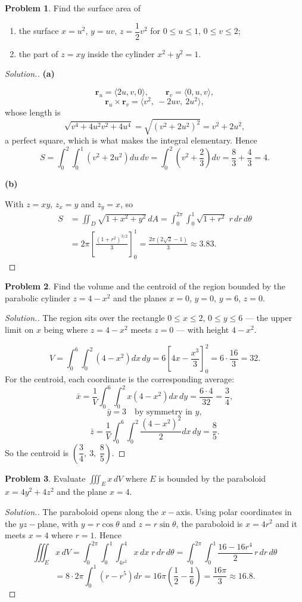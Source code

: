 \documentclass[11pt,a4paper]{article}
\theoremstyle{definition}
\newtheorem{problemx}{Problem}[subsection]
\newenvironment{problem}{\begin{problemx}}{\end{problemx}}
\newenvironment{solution}
  {\renewcommand{\qedsymbol}{}\begin{proof}[\textit{Solution}.]}
  {\end{proof}}
\newcommand{\subhead}[1]{%
  \par\medskip\noindent\textbf{#1}\par\nobreak\smallskip}
\begin{document}
\begin{problem}
Find the surface area of
\begin{enumerate}
\item[(a)] the surface $x = u^2$, $y = uv$, $z = \dfrac12v^2$ for
$0\leq u\leq 1$, $0\leq v\leq 2$;
\item[(b)] the part of $z = xy$ inside the cylinder $x^2+y^2 = 1$.
\end{enumerate}
\end{problem}
\begin{solution}
\subhead{(a)}
\[\mathbf r_u = \langle 2u, v, 0\rangle,\qquad
\mathbf r_v = \langle 0, u, v\rangle ,\]
\[\mathbf r_u\times\mathbf r_v = \langle v^2,\ -2uv,\ 2u^2\rangle ,\]
whose length is
\[\sqrt{v^4+4u^2v^2+4u^4} = \sqrt{(v^2+2u^2)^2} = v^2+2u^2 ,\]
a perfect square, which is what makes the integral elementary. Hence
\[S = \int_0^2\int_0^1(v^2+2u^2)du\,dv
= \int_0^2\left(v^2+\frac23\right)dv = \frac83+\frac43 = 4 .\]

\subhead{(b)}
With $z = xy$, $z_x = y$ and $z_y = x$, so
\begin{align*}
S & = \iint_D\sqrt{1+x^2+y^2}\,dA = \int_0^{2\pi}\int_0^1\sqrt{1+r^2}\;r\,dr\,d\theta\\
& = 2\pi\left[\frac{(1+r^2)^{3/2}}{3}\right]_0^1 = \frac{2\pi(2\sqrt2-1)}{3}\approx 3.83 .
\end{align*}
\end{solution}

\begin{problem}
Find the volume and the centroid of the region bounded by the parabolic cylinder
$z = 4-x^2$ and the planes $x=0$, $y=0$, $y=6$, $z=0$.
\end{problem}
\begin{solution}
The region sits over the rectangle $0\leq x\leq 2$, $0\leq y\leq 6$ --- the
upper limit on $x$ being where $z=4-x^2$ meets $z=0$ --- with height $4-x^2$.

\[V = \int_0^6\int_0^2(4-x^2)dx\,dy
= 6\left[4x-\frac{x^3}{3}\right]_0^2 = 6\cdot\frac{16}{3} = 32 .\]
For the centroid, each coordinate is the corresponding average:
\[\bar x = \frac{1}{V}\int_0^6\int_0^2x(4-x^2)dx\,dy
= \frac{6\cdot 4}{32} = \frac34 ,\]
\[\bar y = 3 \quad\text{by symmetry in } y ,\]
\[\bar z = \frac{1}{V}\int_0^6\int_0^2\frac{(4-x^2)^2}{2}dx\,dy
= \frac{8}{5}.\]
So the centroid is $\left(\dfrac34,\ 3,\ \dfrac85\right)$.
\end{solution}

\begin{problem}
Evaluate $\displaystyle{\iiint_E x\,dV}$ where $E$ is bounded by the paraboloid
$x = 4y^2+4z^2$ and the plane $x=4$.
\end{problem}
\begin{solution}
The paraboloid opens along the $x-$axis. Using polar coordinates in the
$yz-$plane, with $y = r\cos\theta$ and $z = r\sin\theta$, the paraboloid is
$x = 4r^2$ and it meets $x=4$ where $r=1$. Hence
\[\iiint_E x\,dV
= \int_0^{2\pi}\int_0^1\int_{4r^2}^{4}x\,dx\;r\,dr\,d\theta
= \int_0^{2\pi}\int_0^1\frac{16-16r^4}{2}\,r\,dr\,d\theta\]
\[= 8\cdot 2\pi\int_0^1(r-r^5)dr
= 16\pi\left(\frac12-\frac16\right) = \frac{16\pi}{3}\approx 16.8 .\]
\end{solution}
\end{document}
